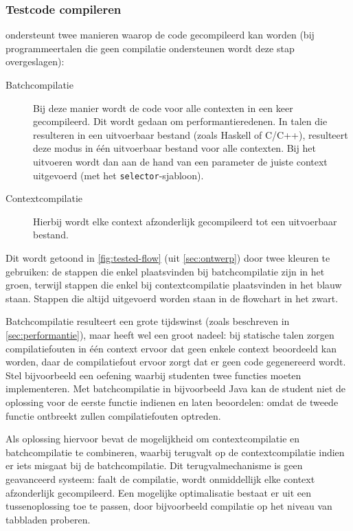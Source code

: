\subsubsection{Testcode compileren}

\tested{} ondersteunt twee manieren waarop de code gecompileerd kan worden (bij programmeertalen die geen compilatie ondersteunen wordt deze stap overgeslagen):

\begin{description}
    \item[Batchcompilatie] Bij deze manier wordt de code voor alle contexten in een keer gecompileerd.
    Dit wordt gedaan om performantieredenen.
    In talen die resulteren in een uitvoerbaar bestand (zoals Haskell of C/C++), resulteert deze modus in één uitvoerbaar bestand voor alle contexten.
    Bij het uitvoeren wordt dan aan de hand van een parameter de juiste context uitgevoerd (met het \texttt{selector}-sjabloon).
    \item[Contextcompilatie] Hierbij wordt elke context afzonderlijk gecompileerd tot een uitvoerbaar bestand.
\end{description}

Dit wordt getoond in \cref{fig:tested-flow} (uit \cref{sec:ontwerp}) door twee kleuren te gebruiken: de stappen die enkel plaatsvinden bij batchcompilatie zijn in het \textcolor{ugent-ps}{groen}, terwijl stappen die enkel bij contextcompilatie plaatsvinden in het \textcolor{ugent-we}{blauw} staan.
Stappen die altijd uitgevoerd worden staan in de flowchart in het zwart.

Batchcompilatie resulteert een grote tijdswinst (zoals beschreven in \cref{sec:performantie}), maar heeft wel een groot nadeel: bij statische talen zorgen compilatiefouten in één context ervoor dat geen enkele context beoordeeld kan worden, daar de compilatiefout ervoor zorgt dat er geen code gegenereerd wordt.
Stel bijvoorbeeld een oefening waarbij studenten twee functies moeten implementeren.
Met batchcompilatie in bijvoorbeeld Java kan de student niet de oplossing voor de eerste functie indienen en laten beoordelen: omdat de tweede functie ontbreekt zullen compilatiefouten optreden.

Als oplossing hiervoor bevat \tested{} de mogelijkheid om contextcompilatie en batchcompilatie te combineren, waarbij \tested{} terugvalt op de contextcompilatie indien er iets misgaat bij de batchcompilatie.
Dit terugvalmechanisme is geen geavanceerd systeem: faalt de compilatie, wordt onmiddellijk elke context afzonderlijk gecompileerd.
Een mogelijke optimalisatie bestaat er uit een tussenoplossing toe te passen, door bijvoorbeeld compilatie op het niveau van tabbladen proberen.

